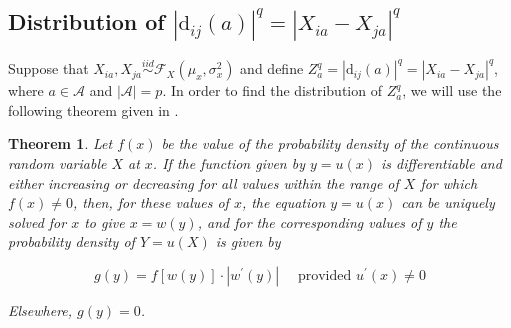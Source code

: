 \documentclass[aos]{imsart}
\newtheorem{theorem}{Theorem}[section]
\begin{document}
\subsection{Distribution of \texorpdfstring{$|\text{d}_{ij}(a)|^q = |X_{ia} - X_{ja}|^q$}{}}

Suppose that $X_{ia}, X_{ja} \overset{iid}{\sim} \mathcal{F}_X(\mu_x,\sigma^2_x)$ and define $Z^q_a = |\text{d}_{ij}(a)|^q = |X_{ia} - X_{ja}|^q$, where $a \in \mathcal{A}$ and $|\mathcal{A}| = p$. In order to find the distribution of $Z^q_a$, we will use the following theorem given in \cite{freund2004}.

\begin{theorem}\label{thm:freund}
	Let $f(x)$ be the value of the probability density of the continuous random variable $X$ at $x$. If the function given by $y = u(x)$ is differentiable and either increasing or decreasing for all values within the range of $X$ for which $f(x) \neq 0$, then, for these values of $x$, the equation $y = u(x)$ can be uniquely solved for $x$ to give $x = w(y)$, and for the corresponding values of $y$ the probability density of $Y = u(X)$ is given by
	
	\[g(y) = f[w(y)] \cdot |w^\prime(y)| \quad \text{ provided } u^\prime(x) \neq 0\]
	
	\noindent Elsewhere, $g(y) = 0$.
\end{theorem}
\end{document}
